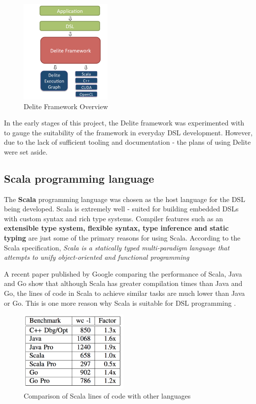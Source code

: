 \begin{figure}[H]
  \centering
    \includegraphics[width=170px]{figures/delite.png}
  \caption{Delite Framework Overview}
\end{figure}

\noindent
In the early stages of this project, the Delite framework was experimented with to gauge the suitability of the framework in everyday DSL development. However, due to the lack of sufficient tooling and documentation - the plans of using Delite were set aside.
\bigskip

\subsection{Scala programming language}
The \textbf{Scala} programming language was chosen as the host language for the DSL being developed. Scala is extremely well - suited for building embedded DSLs with custom syntax and rich type systems. Compiler features such as an \textbf{extensible type system, flexible syntax, type inference and static typing} are just some of the primary reasons for using Scala. According to the Scala specification, \textit{Scala is a statically typed multi-paradigm language that attempts to unify object-oriented and functional programming} \cite{scala}
\bigskip

\noindent
A recent paper published by Google comparing the performance of Scala, Java and Go show that although Scala has greater compilation times than Java and Go, the lines of code in Scala to achieve similar tasks are much lower than Java or Go. This is one more reason why Scala is suitable for DSL programming \cite{performanceComparison}.

\begin{figure}[H]
  \centering
    \includegraphics[height=150px]{figures/scala_loc.png}
  \caption{Comparison of Scala lines of code with other languages}
\end{figure}

